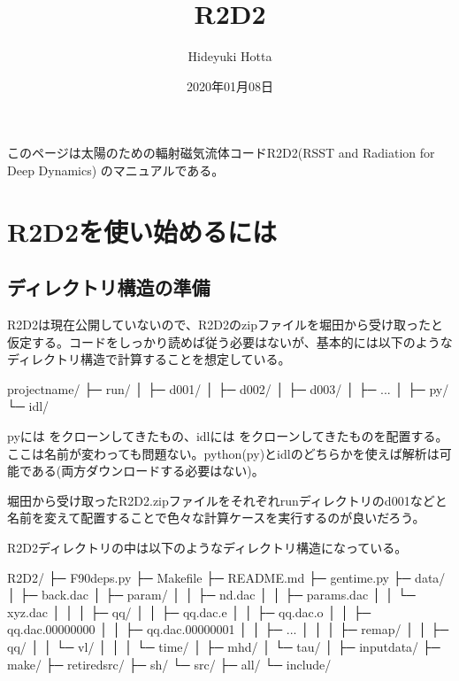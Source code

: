 \documentclass[letterpaper,10pt,dvipdfmx,report]{sphinxmanual}
\title{R2D2}
\date{2020年01月08日}
\author{Hideyuki Hotta}
\let\sphinxpxdimen\pdfpxdimen\else\newdimen\sphinxpxdimen
\begin{document}
\pagestyle{empty}
\sphinxmaketitle
\pagestyle{plain}
\sphinxtableofcontents
\pagestyle{normal}
\label{\detokenize{index::doc}}


このページは太陽のための輻射磁気流体コードR2D2(RSST and Radiation for Deep Dynamics)
のマニュアルである。


\noindent\sphinxincludegraphics[width=350\sphinxpxdimen]{{R2D2_logo}.png}


\chapter{R2D2を使い始めるには}
\label{\detokenize{start:r2d2}}\label{\detokenize{start::doc}}

\section{ディレクトリ構造の準備}
\label{\detokenize{start:id1}}
R2D2は現在公開していないので、R2D2のzipファイルを堀田から受け取ったと仮定する。コードをしっかり読めば従う必要はないが、基本的には以下のようなディレクトリ構造で計算することを想定している。

\begin{sphinxVerbatim}[commandchars=\\\{\}]
project\PYGZus{}name/
           ├─ run/
           │    ├─ d001/
           │    ├─ d002/
           │    ├─ d003/
           │    ├─ ...
           │
           ├─ py/
           └─ idl/
\end{sphinxVerbatim}

pyには  をクローンしてきたもの、idlには  をクローンしてきたものを配置する。ここは名前が変わっても問題ない。python(py)とidlのどちらかを使えば解析は可能である(両方ダウンロードする必要はない)。

堀田から受け取ったR2D2.zipファイルをそれぞれrunディレクトリのd001などと名前を変えて配置することで色々な計算ケースを実行するのが良いだろう。

R2D2ディレクトリの中は以下のようなディレクトリ構造になっている。

\begin{sphinxVerbatim}[commandchars=\\\{\}]
R2D2/
   ├─ F90\PYGZus{}deps.py
   ├─ Makefile
   ├─ README.md
   ├─ gen\PYGZus{}time.py
   ├─ data/
   │     ├─ back.dac
   │     ├─ param/
   │     │      ├─ nd.dac
   │     │      ├─ params.dac
   │     │      └─ xyz.dac
   │     │
   │     ├─ qq/
   │     │   ├─ qq.dac.e
   │     │   ├─ qq.dac.o
   │     │   ├─ qq.dac.00000000
   │     │   ├─ qq.dac.00000001
   │     │   ├─ ...
   │     │
   │     ├─ remap/
   │     │      ├─ qq/
   │     │      └─ vl/
   │     │
   │     └─ time/
   │           ├─ mhd/
   │           └─ tau/
   │
   ├─ input\PYGZus{}data/
   ├─ make/
   ├─ retired\PYGZus{}src/
   ├─ sh/
   └─ src/
        ├─ all/
        └─ include/
\end{sphinxVerbatim}
\end{document}
